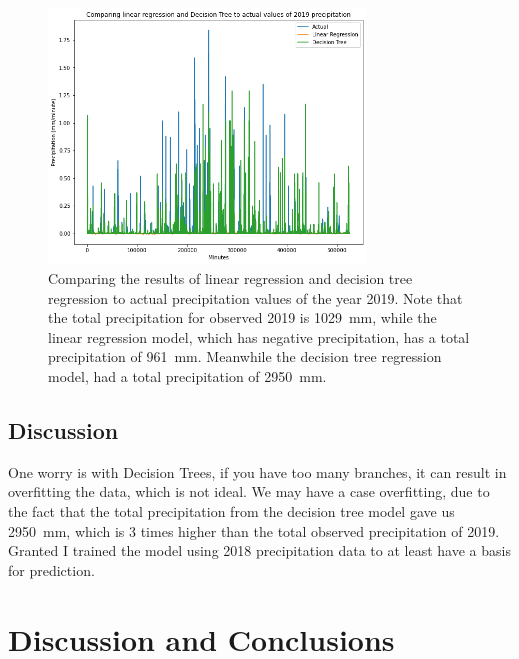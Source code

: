 \documentclass[11pt]{report}
\begin{document}
\begin{figure}
	\centering
	\includegraphics[width = 0.75\textwidth]{Figures/Comparison.png}
	\caption[Comparing ML results to actual precipitation values]{
          Comparing the results of linear regression and decision tree
          regression to actual precipitation values of the year 2019. Note
          that the total precipitation for observed 2019 is 1029~mm, while
          the linear regression model, which has negative precipitation, has
          a total precipitation of 961~mm. Meanwhile the decision tree
          regression model, had a total precipitation of 2950~mm. }
\end{figure}
\subsection{Discussion}

One worry is with Decision Trees, if you have too many branches, it can
result in overfitting the data, which is not ideal. We may have a case
overfitting, due to the fact that the total precipitation from the decision
tree model gave us 2950~mm, which is 3 times higher than the total observed
precipitation of 2019. Granted I trained the model using 2018 precipitation
data to at least have a basis for prediction.

\clearpage

\section{Discussion and Conclusions}\label{sec:conclusions}

\small
\renewcommand{\bibsep}{0em}

\renewcommand{\bibname}{References}


\end{document}
